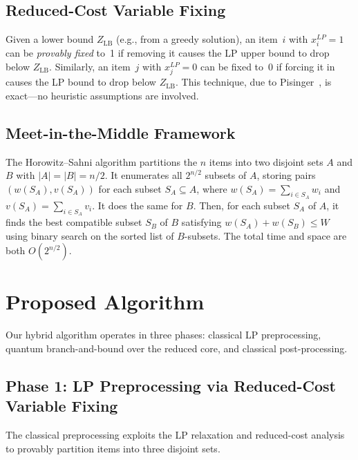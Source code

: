 \documentclass[conference]{IEEEtran}
\begin{document}
\subsection{Reduced-Cost Variable Fixing}

Given a lower bound $Z_{\text{LB}}$ (e.g., from a greedy solution), an item~$i$ with $x_i^{LP} = 1$ can be \textit{provably fixed} to~1 if removing it causes the LP upper bound to drop below $Z_{\text{LB}}$. Similarly, an item~$j$ with $x_j^{LP} = 0$ can be fixed to~0 if forcing it in causes the LP bound to drop below $Z_{\text{LB}}$. This technique, due to Pisinger~\cite{ref4}, is exact---no heuristic assumptions are involved.

\subsection{Meet-in-the-Middle Framework}

The Horowitz--Sahni algorithm \cite{ref2} partitions the $n$ items into two disjoint sets $A$ and $B$ with $|A| = |B| = n/2$. It enumerates all $2^{n/2}$ subsets of $A$, storing pairs $(w(S_A), v(S_A))$ for each subset $S_A \subseteq A$, where $w(S_A) = \sum_{i \in S_A} w_i$ and $v(S_A) = \sum_{i \in S_A} v_i$. It does the same for $B$. Then, for each subset $S_A$ of $A$, it finds the best compatible subset $S_B$ of $B$ satisfying $w(S_A) + w(S_B) \leq W$ using binary search on the sorted list of $B$-subsets. The total time and space are both $O(2^{n/2})$.

\section{Proposed Algorithm}

Our hybrid algorithm operates in three phases: classical LP preprocessing, quantum branch-and-bound over the reduced core, and classical post-processing.

\subsection{Phase 1: LP Preprocessing via Reduced-Cost Variable Fixing}

The classical preprocessing exploits the LP relaxation and reduced-cost analysis to provably partition items into three disjoint sets.
\end{document}
